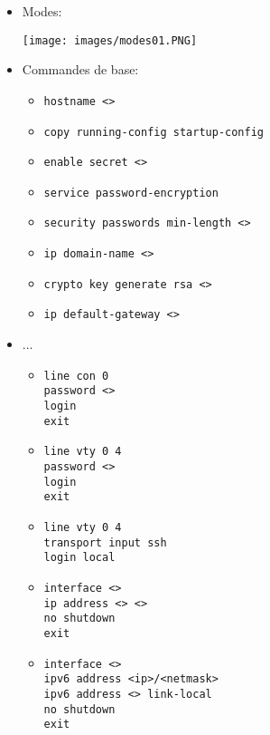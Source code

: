 \documentclass[a4paper]{article}
\begin{document}
\begin{itemize}





\item Modes:
\begin{center}
    \texttt{[image: images/modes01.PNG]}
\end{center}





\item Commandes de base:
\begin{itemize}
    \item \texttt{hostname <>}
    \item \texttt{copy running-config startup-config}
    \item \texttt{enable secret <>}
    \item \texttt{service password-encryption}
    \item \texttt{security passwords min-length <>}
    \item \texttt{ip domain-name <>}
    \item \texttt{crypto key generate rsa <>}
    \item \texttt{ip default-gateway <>}
\end{itemize}





\item ...
\begin{itemize}

\item %
\begin{verbatim}
line con 0
password <>
login
exit
\end{verbatim}

\item %
\begin{verbatim}
line vty 0 4
password <>
login
exit
\end{verbatim}

\item %
\begin{verbatim}
line vty 0 4
transport input ssh
login local
\end{verbatim}

\item %
\begin{verbatim}
interface <>
ip address <> <>
no shutdown
exit
\end{verbatim}

\item %
\begin{verbatim}
interface <>
ipv6 address <ip>/<netmask>
ipv6 address <> link-local
no shutdown
exit
\end{verbatim}

\end{itemize}




\end{itemize}
\end{document}
